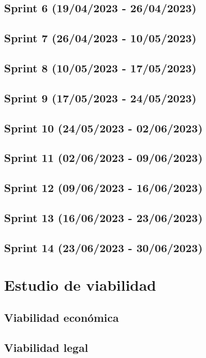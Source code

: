 \subsection{Sprint 6 (19/04/2023 - 26/04/2023)}

\subsection{Sprint 7 (26/04/2023 - 10/05/2023)}

\subsection{Sprint 8 (10/05/2023 - 17/05/2023)}

\subsection{Sprint 9 (17/05/2023 - 24/05/2023)}

\subsection{Sprint 10 (24/05/2023 - 02/06/2023)}

\subsection{Sprint 11 (02/06/2023 - 09/06/2023)}

\subsection{Sprint 12 (09/06/2023 - 16/06/2023)}

\subsection{Sprint 13 (16/06/2023 - 23/06/2023)}

\subsection{Sprint 14 (23/06/2023 - 30/06/2023)}

\section{Estudio de viabilidad}

\subsection{Viabilidad económica}

\subsection{Viabilidad legal}